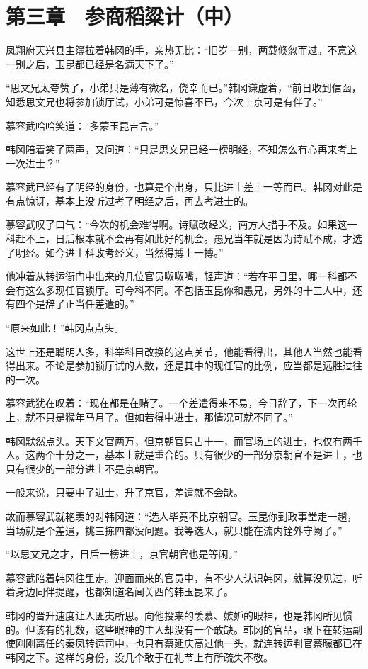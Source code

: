 \section{第三章　参商稻粱计（中）}

凤翔府天兴县主簿拉着韩冈的手，亲热无比：“旧岁一别，两载倏忽而过。不意这一别之后，玉昆都已经是名满天下了。”

“思文兄太夸赞了，小弟只是薄有微名，侥幸而已。”韩冈谦虚着，“前日收到信函，知悉思文兄也将参加锁厅试，小弟可是惊喜不已，今次上京可是有伴了。”

慕容武哈哈笑道：“多蒙玉昆吉言。”

韩冈陪着笑了两声，又问道：“只是思文兄已经一榜明经，不知怎么有心再来考上一次进士？”

慕容武已经有了明经的身份，也算是个出身，只比进士差上一等而已。韩冈对此是有点惊讶，基本上没听过考了明经之后，再去考进士的。

慕容武叹了口气：“今次的机会难得啊。诗赋改经义，南方人措手不及。如果这一科赶不上，日后根本就不会再有如此好的机会。愚兄当年就是因为诗赋不成，才选了明经。如今进士科改考经义，当然得搏上一搏。”

他冲着从转运衙门中出来的几位官员呶呶嘴，轻声道：“若在平日里，哪一科都不会有这么多现任官锁厅。可今科不同。不包括玉昆你和愚兄，另外的十三人中，还有四个是辞了正当任差遣的。”

“原来如此！”韩冈点点头。

这世上还是聪明人多，科举科目改换的这点关节，他能看得出，其他人当然也能看得出来。不论是参加锁厅试的人数，还是其中的现任官的比例，应当都是远胜过往的一次。

慕容武犹在叹着：“现在都是在赌了。一个差遣得来不易，今日辞了，下一次再轮上，就不只是猴年马月了。但如若得中进士，那情况可就不同了。”

韩冈默然点头。天下文官两万，但京朝官只占十一，而官场上的进士，也仅有两千人。这两个十分之一，基本上就是重合的。只有很少的一部分京朝官不是进士，也只有很少的一部分进士不是京朝官。

一般来说，只要中了进士，升了京官，差遣就不会缺。

故而慕容武就艳羡的对韩冈道：“选人毕竟不比京朝官。玉昆你到政事堂走一趟，当场就是个差遣，挑三拣四都没问题。我等选人，就只能在流内铨外守阙了。”

“以思文兄之才，日后一榜进士，京官朝官也是等闲。”

慕容武陪着韩冈往里走。迎面而来的官员中，有不少人认识韩冈，就算没见过，听着身边同伴提醒，也都知道名闻关西的韩玉昆来了。

韩冈的晋升速度让人匪夷所思。向他投来的羡慕、嫉妒的眼神，也是韩冈所见惯的。但该有的礼数，这些眼神的主人却没有一个敢缺。韩冈的官品，眼下在转运副使刚刚离任的秦凤转运司中，也只有蔡延庆高过他一头，就连转运判官蔡曚都已在韩冈之下。这样的身份，没几个敢于在礼节上有所疏失不敬。

